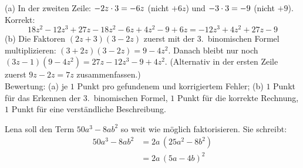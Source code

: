\documentclass[11pt]{exam}
\begin{document}
\begin{questions}
{\begin{solution}
	(a) In der zweiten Zeile: $-2z\cdot3=-6z$ (nicht $+6z$) und $-3\cdot3=-9$ (nicht $+9$). Korrekt:
	\[18z^2-12z^3+27z-18z^2-6z+4z^2-9+6z=-12z^3+4z^2+27z-9\]
	(b) Die Faktoren $(2z+3)(3-2z)$ zuerst mit der 3.\ binomischen Formel multiplizieren: $(3+2z)(3-2z)=9-4z^2$. Danach bleibt nur noch $(3z-1)(9-4z^2)=27z-12z^3-9+4z^2$. (Alternativ in der ersten Zeile zuerst $9z-2z=7z$ zusammenfassen.)\\
	Bewertung: (a) je $1$ Punkt pro gefundenem und korrigiertem Fehler; (b) $1$ Punkt für das Erkennen der 3.\ binomischen Formel, $1$ Punkt für die korrekte Rechnung, $1$ Punkt für eine verständliche Beschreibung.
\end{solution}}
{}


\noaddpoints
\question[\totalpoints]
\addpoints
Lena soll den Term $50a^3-8ab^2$ so weit wie möglich faktorisieren. Sie schreibt:
\begin{align*}
	50a^3-8ab^2&=2a\,(25a^2-8b^2)\\
	&=2a\,(5a-4b)^2
\end{align*}
\begin{parts}
	\setcounter{partno}{1}

\end{parts}
\end{questions}
\end{document}
